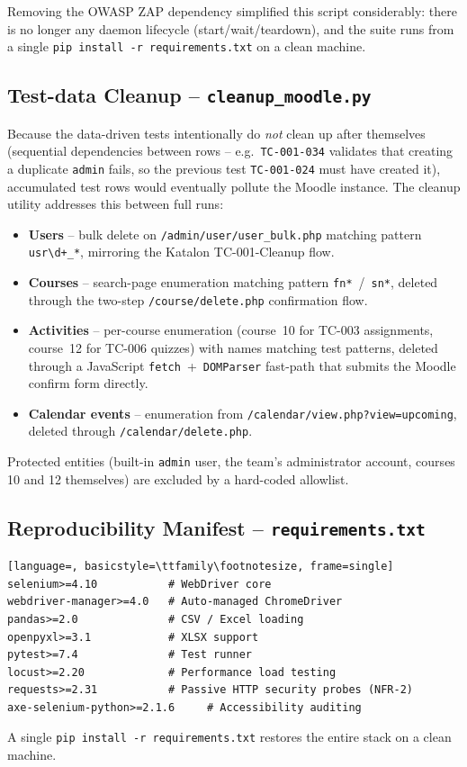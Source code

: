 \documentclass[twoside,final]{hcmut-report}
\begin{document}
Removing the OWASP ZAP dependency simplified this script considerably: there is no longer any daemon lifecycle (start/wait/teardown), and the suite runs from a single \texttt{pip install -r requirements.txt} on a clean machine.

\subsection{Test-data Cleanup -- \texttt{cleanup\_moodle.py}}
Because the data-driven tests intentionally do \emph{not} clean up after themselves (sequential dependencies between rows -- e.g.\ \texttt{TC-001-034} validates that creating a duplicate \texttt{admin} fails, so the previous test \texttt{TC-001-024} must have created it), accumulated test rows would eventually pollute the Moodle instance. The cleanup utility addresses this between full runs:

\begin{itemize}
    \item \textbf{Users} -- bulk delete on \texttt{/admin/user/user\_bulk.php} matching pattern \texttt{usr\textbackslash{}d+\_*}, mirroring the Katalon TC-001-Cleanup flow.
    \item \textbf{Courses} -- search-page enumeration matching pattern \texttt{fn*}~/~\texttt{sn*}, deleted through the two-step \texttt{/course/delete.php} confirmation flow.
    \item \textbf{Activities} -- per-course enumeration (course~10 for TC-003 assignments, course~12 for TC-006 quizzes) with names matching test patterns, deleted through a JavaScript \texttt{fetch}~+~\texttt{DOMParser} fast-path that submits the Moodle confirm form directly.
    \item \textbf{Calendar events} -- enumeration from \texttt{/calendar/view.php?view=upcoming}, deleted through \texttt{/calendar/delete.php}.
\end{itemize}

Protected entities (built-in \texttt{admin} user, the team's administrator account, courses 10 and 12 themselves) are excluded by a hard-coded allowlist.

\subsection{Reproducibility Manifest -- \texttt{requirements.txt}}
\begin{lstlisting}[language=, basicstyle=\ttfamily\footnotesize, frame=single]
selenium>=4.10           # WebDriver core
webdriver-manager>=4.0   # Auto-managed ChromeDriver
pandas>=2.0              # CSV / Excel loading
openpyxl>=3.1            # XLSX support
pytest>=7.4              # Test runner
locust>=2.20             # Performance load testing
requests>=2.31           # Passive HTTP security probes (NFR-2)
axe-selenium-python>=2.1.6     # Accessibility auditing
\end{lstlisting}
A single \texttt{pip install -r requirements.txt} restores the entire stack on a clean machine.
\end{document}
